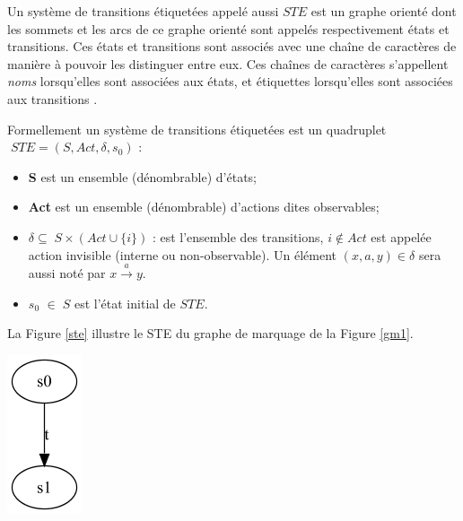 \begin{definition}
Un système de transitions étiquetées appelé aussi $STE$ est un graphe orienté dont les sommets et les arcs de ce graphe orienté sont appelés respectivement états et transitions. Ces états et transitions sont associés avec une chaîne de caractères de manière à pouvoir les  distinguer entre eux.  Ces chaînes de caractères s'appellent \emph{noms} lorsqu'elles sont associées aux états, et étiquettes lorsqu'elles sont associées aux transitions .


Formellement un système de transitions étiquetées  est un quadruplet $\; STE = (S, Act, \delta, s_0)$ \citep{Saidouni2012}:
\begin{itemize}
	\item\textbf{S} est un ensemble (dénombrable) d'états;
	\item \textbf{Act}  est un ensemble (dénombrable) d'actions dites observables; 
 	\item  $\delta\subseteq \; S \times (Act \cup \{i\})$ : est l'ensemble des transitions, $i \notin Act$ est appelée action invisible (interne ou non-observable). Un élément $(x, a, y) \in \delta $ sera aussi noté par $x \stackrel{a}{\rightarrow}y$.
 	\item $s_0$ $\in\; S$ est l'état initial de $STE$. 
\end{itemize}

La Figure \ref{ste} illustre le STE du graphe de marquage de la Figure \ref{gm1}.
\begin{center}
	\includegraphics[scale=0.4]{img/ste.PNG}
	 \label{ste}
 \end{center}
\end{definition}

